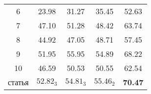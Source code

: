 \begin{table}[htp!]
\begin{tabular}{ccccc}
6                               & 23.98                              & 31.27                                   & 35.45                                   & 52.63                                                        \\
7                               & 47.10                              & 51.28                                   & 48.42                                   & 63.74                                                        \\
8                               & 44.92                              & 47.05                                   & 48.71                                   & 57.45                                                        \\
9                               & 51.95                              & 55.95                                   & 54.89                                   & 68.22                                                        \\
10                              & 46.59                              & 50.53                                   & 50.55                                   & 62.54                                                        \\ \hline
\cellcolor[HTML]{C0C0C0} статья & \cellcolor[HTML]{C0C0C0}$52.82_3$  & \cellcolor[HTML]{C0C0C0}$54.81_3$       & \cellcolor[HTML]{C0C0C0}$55.46_2$       & \cellcolor[HTML]{C0C0C0}\textbf{70.47}                       \\ \hline
\end{tabular}
\end{table}
